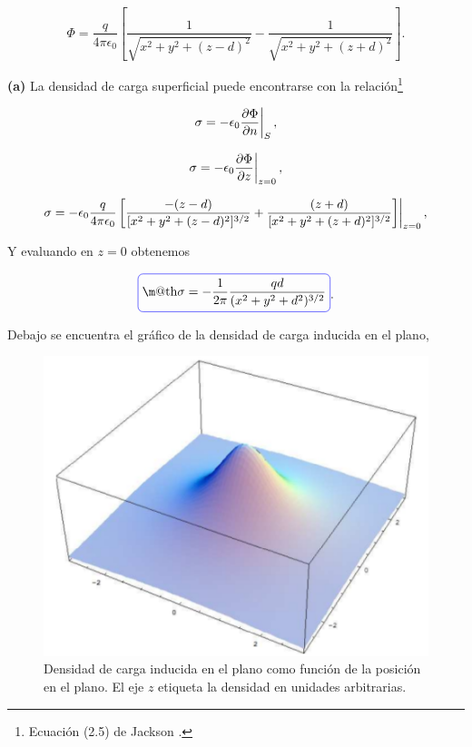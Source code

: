 \documentclass[a4paper,11pt]{article}
\makeatletter
\numberwithin{equation}{section}
\newcommand{\zerodel}{.\kern-\nulldelimiterspace}
\newcommand*{\boxcolor}{blue}
\renewcommand{\boxed}[1]{\textcolor{\boxcolor}{%
\tikz[baseline={([yshift=-1ex]current bounding box.center)}] \node [rectangle, minimum width=1ex,rounded corners,draw] {\normalcolor\m@th$\displaystyle#1$};}}
\makeatother
\begin{document}
\begin{equation}
 \Phi = \frac{q}{4\pi\epsilon_0}\left[\frac{1}{\sqrt{x^2+y^2+(z-d)^2}} 
 - \frac{1}{\sqrt{x^2+y^2+(z+d)^2}} \right].
\end{equation}

\textbf{(a)} La densidad de carga superficial puede encontrarse con la 
relación\footnote{Ecuación (2.5) de Jackson \cite{jackson3}.} 

\begin{equation}
 \left\zerodel \sigma = -\epsilon_0\frac{\partial\Phi}{\partial n}\right|_{S},
\end{equation}

\begin{equation}
 \left\zerodel \sigma = -\epsilon_0\frac{\partial\Phi}{\partial z}\right|_{z=0},
\end{equation}

\begin{equation}
  \left\zerodel \sigma = -\epsilon_0\frac{q}{4\pi\epsilon_0}\left[\frac{-(z-d)}{[x^2+y^2+(z-d)^2]^{3/2}} 
  + \frac{(z+d)}{[x^2+y^2+(z+d)^2]^{3/2}}\right]\right|_{z=0},
\end{equation}

Y evaluando en $z=0$ obtenemos 

\begin{equation}
 \boxed{\sigma = - \frac{1}{2\pi}\frac{qd}{(x^2+y^2+d^2)^{3/2}}}.
\end{equation}

Debajo se encuentra el gráfico de la densidad de carga inducida en el plano, 

\begin{figure}[H]
 \center
 \includegraphics[scale=0.5]{problema1fig1}
 \caption{Densidad de carga inducida en el plano como función de la posición 
 en el plano. El eje $z$ etiqueta la densidad en unidades arbitrarias.}
\end{figure}
\end{document}
